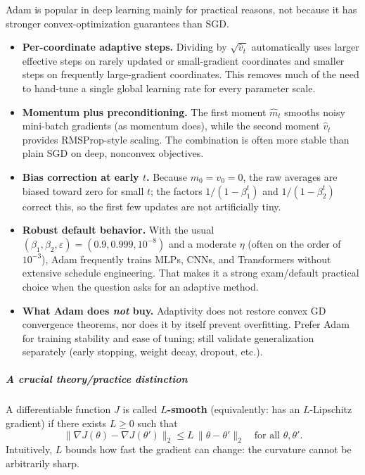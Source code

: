 \documentclass[11pt,a4paper]{article}
\theoremstyle{definition}
\begin{document}
\begin{remark}
Adam is popular in deep learning mainly for practical reasons, not because it has stronger convex-optimization guarantees than SGD.
\begin{itemize}
  \item \textbf{Per-coordinate adaptive steps.}
  Dividing by $\sqrt{\widehat{v}_t}$ automatically uses larger effective steps on rarely updated or small-gradient coordinates and smaller steps on frequently large-gradient coordinates.
  This removes much of the need to hand-tune a single global learning rate for every parameter scale.
  \item \textbf{Momentum plus preconditioning.}
  The first moment $\widehat{m}_t$ smooths noisy mini-batch gradients (as momentum does), while the second moment $\widehat{v}_t$ provides RMSProp-style scaling.
  The combination is often more stable than plain SGD on deep, nonconvex objectives.
  \item \textbf{Bias correction at early $t$.}
  Because $m_0=v_0=0$, the raw averages are biased toward zero for small $t$; the factors $1/(1-\beta_1^t)$ and $1/(1-\beta_2^t)$ correct this, so the first few updates are not artificially tiny.
  \item \textbf{Robust default behavior.}
  With the usual $(\beta_1,\beta_2,\varepsilon)=(0.9,0.999,10^{-8})$ and a moderate $\eta$ (often on the order of $10^{-3}$), Adam frequently trains MLPs, CNNs, and Transformers without extensive schedule engineering.
  That makes it a strong exam/default practical choice when the question asks for an adaptive method.
  \item \textbf{What Adam does \emph{not} buy.}
  Adaptivity does not restore convex GD convergence theorems, nor does it by itself prevent overfitting.
  Prefer Adam for training stability and ease of tuning; still validate generalization separately (early stopping, weight decay, dropout, etc.).
\end{itemize}
\end{remark}

\subparagraph{A crucial theory/practice distinction}

A differentiable function $J$ is called \textbf{$L$-smooth} (equivalently: has an $L$-Lipschitz gradient) if there exists $L\geq 0$ such that
\[
\bigl\|\nabla J(\theta)-\nabla J(\theta')\bigr\|_2
\leq
L\,\|\theta-\theta'\|_2
\quad\text{for all }\theta,\theta'.
\]
Intuitively, $L$ bounds how fast the gradient can change: the curvature cannot be arbitrarily sharp.
\end{document}
